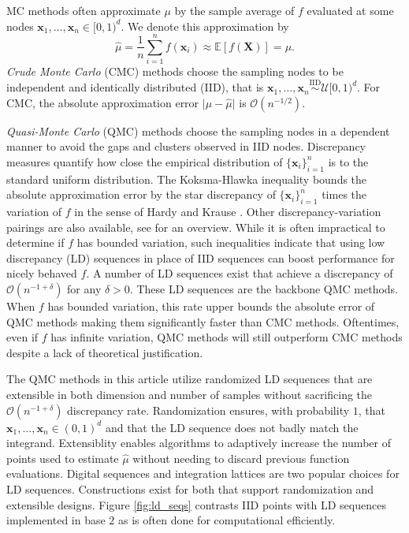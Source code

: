 \documentclass[graybox]{svmult}
\begin{document}
MC methods often approximate $\mu$ by the sample average of $f$ evaluated at some nodes $\boldsymbol{x}_1,\dots,\boldsymbol{x}_n \in [0,1)^d$. We denote this approximation by  
\begin{equation}
    \label{eq:mcapprox}
    \hat{\mu} = \frac{1}{n}\sum_{i=1}^n f(\boldsymbol{x}_i) \approx \mathbb{E}[f(\boldsymbol{X})] = \mu. 
\end{equation}
\emph{Crude Monte Carlo} (CMC) methods choose the sampling nodes to be independent and identically distributed (IID), that is $\boldsymbol{x}_1,\dots,\boldsymbol{x}_n \overset{\text{IID}}{\sim} \mathcal{U}[0,1)^{d}$. For CMC, the absolute approximation error $\lvert \mu - \hat{\mu} \rvert$ is $\mathcal{O}(n^{-1/2})$. 

\emph{Quasi-Monte Carlo} (QMC) methods choose the sampling nodes in a dependent manner to avoid the gaps and clusters observed in IID nodes. Discrepancy measures quantify how close the empirical distribution of $\{\boldsymbol{x}_i\}_{i=1}^n$ is to the standard uniform distribution. The Koksma-Hlawka inequality bounds the absolute approximation error by the star discrepancy of $\{\boldsymbol{x}_i\}_{i=1}^n$ times the variation of $f$ in the sense of Hardy and Krause \cite{dick2013high}. Other discrepancy-variation pairings are also available, see \cite{hickernell1998generalized} for an overview. While it is often impractical to determine if $f$ has bounded variation, such inequalities indicate that using low discrepancy (LD) sequences in place of IID sequences can boost performance for nicely behaved $f$. A number of LD sequences exist that achieve a discrepancy of $\mathcal{O}(n^{-1+\delta})$ for any $\delta > 0$. These LD sequences are the backbone QMC methods. When $f$ has bounded variation, this rate upper bounds the absolute error of QMC methods making them significantly faster than CMC methods. Oftentimes, even if $f$ has infinite variation, QMC methods will still outperform CMC methods despite a lack of theoretical justification. 


The QMC methods in this article utilize randomized LD sequences that are extensible in both dimension and number of samples without sacrificing the $\mathcal{O}(n^{-1+\delta})$ discrepancy rate. Randomization ensures, with probability $1$, that $\boldsymbol{x}_1,\dots,\boldsymbol{x}_n \in (0,1)^d$ and that the LD sequence does not badly match the integrand. Extensiblity enables algorithms to adaptively increase the number of points used to estimate $\hat{\mu}$ without needing to discard previous function evaluations. Digital sequences and integration lattices are two popular choices for LD sequences. Constructions exist for both that support randomization and extensible designs. Figure \ref{fig:ld_seqs} contrasts IID points with LD sequences implemented in base $2$ as is often done for computational efficiently.
\end{document}
